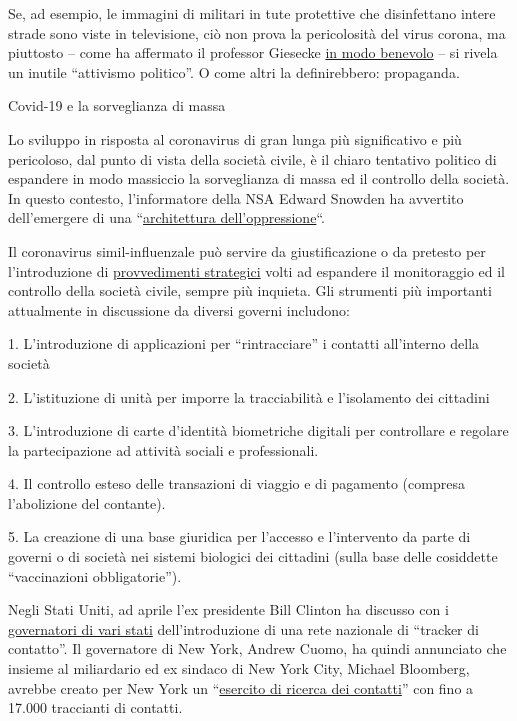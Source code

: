Se, ad esempio, le immagini di militari in tute protettive che
disinfettano intere strade sono viste in televisione, ciò non prova la
pericolosità del virus corona, ma piuttosto -- come ha affermato il
professor Giesecke
\href{https://www.addendum.org/coronavirus/interview-johan-giesecke/}{in
modo benevolo} -- si rivela un inutile ``attivismo politico''. O come
altri la definirebbero: propaganda.

Covid-19 e la sorveglianza di massa

Lo sviluppo in risposta al coronavirus di gran lunga più significativo e
più pericoloso, dal punto di vista della società civile, è il chiaro
tentativo politico di espandere in modo massiccio la sorveglianza di
massa ed il controllo della società. In questo contesto, l'informatore
della NSA Edward Snowden ha avvertito dell'emergere di una
``\href{https://www.vice.com/en_us/article/bvge5q/snowden-warns-governments-are-using-coronavirus-to-build-the-architecture-of-oppression}{architettura
dell'oppressione}``.

Il coronavirus simil-influenzale può servire da giustificazione o da
pretesto per l'introduzione di
\href{https://norberthaering.de/die-regenten-der-welt/id2020-ktdi-apple-google/}{provvedimenti
strategici} volti ad espandere il monitoraggio ed il controllo della
società civile, sempre più inquieta. Gli strumenti più importanti
attualmente in discussione da diversi governi includono:

1. L'introduzione di applicazioni per ``rintracciare'' i contatti
all'interno della società

2. L'istituzione di unità per imporre la tracciabilità e l'isolamento
dei cittadini

3. L'introduzione di carte d'identità biometriche digitali per
controllare e regolare la partecipazione ad attività sociali e
professionali.

4. Il controllo esteso delle transazioni di viaggio e di pagamento
(compresa l'abolizione del contante).

5. La creazione di una base giuridica per l'accesso e l'intervento da
parte di governi o di società nei sistemi biologici dei cittadini (sulla
base delle cosiddette ``vaccinazioni obbligatorie'').

Negli Stati Uniti, ad aprile l'ex presidente Bill Clinton ha discusso
con i \href{https://www.youtube.com/watch?v=-Ug9XHT9JQQ}{governatori di
vari stati} dell'introduzione di una rete nazionale di ``tracker di
contatto''. Il governatore di New York, Andrew Cuomo, ha quindi
annunciato che insieme al miliardario ed ex sindaco di New York City,
Michael Bloomberg, avrebbe creato per New York un
``\href{https://www.cbsnews.com/news/contact-tracing-new-york-cuomo-plan/}{esercito
di ricerca dei contatti}'' con fino a 17.000 traccianti di contatti.


